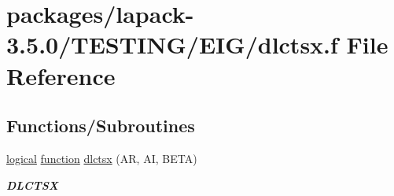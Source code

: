 \hypertarget{dlctsx_8f}{}\section{packages/lapack-\/3.5.0/\+T\+E\+S\+T\+I\+N\+G/\+E\+I\+G/dlctsx.f File Reference}
\label{dlctsx_8f}
\subsection*{Functions/\+Subroutines}
\begin{DoxyCompactItemize}
\item 
\hyperlink{tnc_8c_aa7b64cdf39500931f7b333343791a104}{logical} \hyperlink{afunc_8m_a7b5e596df91eadea6c537c0825e894a7}{function} \hyperlink{group__double__eig_ga14489af521606715c20ff53663f535c9}{dlctsx} (A\+R, A\+I, B\+E\+T\+A)
\begin{DoxyCompactList}\small\item\em {\bfseries D\+L\+C\+T\+S\+X} \end{DoxyCompactList}\end{DoxyCompactItemize}
